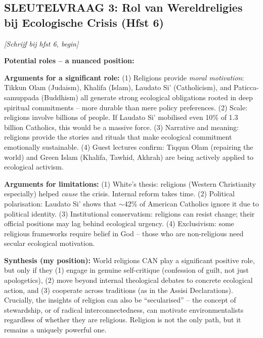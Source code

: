 \documentclass[a4paper,10pt]{article}
\begin{document}
\vspace{3pt}

\begin{answerbox}
\subsection{SLEUTELVRAAG 3: Rol van Wereldreligies bij Ecologische Crisis (Hfst 6)}

\textit{[Schrijf bij hfst 6, begin]}

\textbf{Potential roles -- a nuanced position:}

\textbf{Arguments for a significant role:}
(1) Religions provide \textit{moral motivation}: Tikkun Olam (Judaism), Khalifa (Islam), Laudato Si' (Catholicism), and Paticca-samuppada (Buddhism) all generate strong ecological obligations rooted in deep spiritual commitments -- more durable than mere policy preferences.
(2) Scale: religions involve billions of people. If Laudato Si' mobilised even 10\% of 1.3 billion Catholics, this would be a massive force.
(3) Narrative and meaning: religions provide the stories and rituals that make ecological commitment emotionally sustainable.
(4) Guest lectures confirm: Tiqqun Olam (repairing the world) and Green Islam (Khalifa, Tawhid, Akhrah) are being actively applied to ecological activism.

\textbf{Arguments for limitations:}
(1) White's thesis: religions (Western Christianity especially) helped \textit{cause} the crisis. Internal reform takes time.
(2) Political polarisation: Laudato Si' shows that $\sim$42\% of American Catholics ignore it due to political identity.
(3) Institutional conservatism: religions can resist change; their official positions may lag behind ecological urgency.
(4) Exclusivism: some religious frameworks require belief in God -- those who are non-religious need secular ecological motivation.

\textbf{Synthesis (my position):} World religions CAN play a significant positive role, but only if they (1) engage in genuine self-critique (confession of guilt, not just apologetics), (2) move beyond internal theological debates to concrete ecological action, and (3) cooperate across traditions (as in the Assisi Declarations). Crucially, the insights of religion can also be ``secularised'' -- the concept of stewardship, or of radical interconnectedness, can motivate environmentalists regardless of whether they are religious. Religion is not the only path, but it remains a uniquely powerful one.
\end{answerbox}
\end{document}
